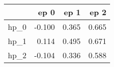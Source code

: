 \begin{tabular}{lrrr}
\toprule
{} &   ep 0 &   ep 1 &   ep 2 \\
\midrule
hp\_0 & -0.100 &  0.365 &  0.665 \\
hp\_1 &  0.114 &  0.495 &  0.671 \\
hp\_2 & -0.104 &  0.336 &  0.588 \\
\bottomrule
\end{tabular}
